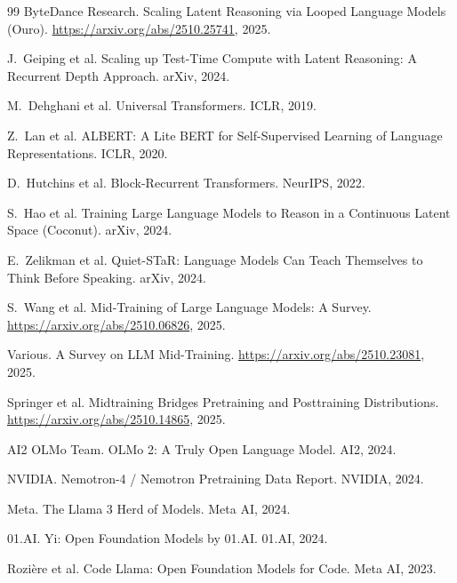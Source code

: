 \documentclass[11pt,a4paper]{article}
\begin{document}
\begin{thebibliography}{99}
ByteDance Research.
\newblock Scaling Latent Reasoning via Looped Language Models (Ouro).
\newblock \url{https://arxiv.org/abs/2510.25741}, 2025.

J.~Geiping et al.
\newblock Scaling up Test-Time Compute with Latent Reasoning: A Recurrent Depth Approach.
\newblock arXiv, 2024.

M.~Dehghani et al.
\newblock Universal Transformers.
\newblock ICLR, 2019.

Z.~Lan et al.
\newblock ALBERT: A Lite BERT for Self-Supervised Learning of Language Representations.
\newblock ICLR, 2020.

D.~Hutchins et al.
\newblock Block-Recurrent Transformers.
\newblock NeurIPS, 2022.

S.~Hao et al.
\newblock Training Large Language Models to Reason in a Continuous Latent Space (Coconut).
\newblock arXiv, 2024.

E.~Zelikman et al.
\newblock Quiet-STaR: Language Models Can Teach Themselves to Think Before Speaking.
\newblock arXiv, 2024.

S.~Wang et al.
\newblock Mid-Training of Large Language Models: A Survey.
\newblock \url{https://arxiv.org/abs/2510.06826}, 2025.

Various.
\newblock A Survey on LLM Mid-Training.
\newblock \url{https://arxiv.org/abs/2510.23081}, 2025.

Springer et al.
\newblock Midtraining Bridges Pretraining and Posttraining Distributions.
\newblock \url{https://arxiv.org/abs/2510.14865}, 2025.

AI2 OLMo Team.
\newblock OLMo 2: A Truly Open Language Model.
\newblock AI2, 2024.

NVIDIA.
\newblock Nemotron-4 / Nemotron Pretraining Data Report.
\newblock NVIDIA, 2024.

Meta.
\newblock The Llama 3 Herd of Models.
\newblock Meta AI, 2024.

01.AI.
\newblock Yi: Open Foundation Models by 01.AI.
\newblock 01.AI, 2024.

Rozi\`ere et al.
\newblock Code Llama: Open Foundation Models for Code.
\newblock Meta AI, 2023.


\end{thebibliography}
\end{document}
